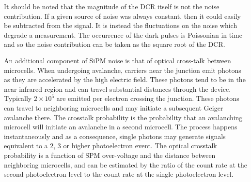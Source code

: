 It should be noted that the magnitude of the DCR itself is not the noise contribution. If a given source of noise was always constant, then it could easily be subtracted from the signal. It is instead the fluctuations on the noise which degrade a measurement. The occurrence of the dark pulses is Poissonian in time and so the noise contribution can be taken as the square root of the DCR.

An additional component of SiPM noise is that of optical cross-talk between microcells. When undergoing avalanche, carriers near the junction emit photons as they are accelerated by the high electric field. These photons tend to be in the near infrared region and can travel substantial distances through the device. Typically $2 \times 10^5$ are emitted per electron crossing the junction. These photons can travel to neighboring microcells and may initiate a subsequent Geiger avalanche there. The crosstalk probability is the probability that an avalanching microcell will initiate an avalanche in a second microcell. The process happens instantaneously and as a consequence, single photons may generate signals equivalent to a 2, 3 or higher photoelectron event. The optical crosstalk probability is a function of SPM over-voltage and the distance between neighboring microcells, and can be estimated by the ratio of the count rate at the second photoelectron level to the count rate at the single photoelectron level. 

